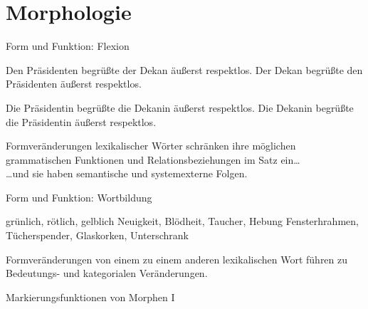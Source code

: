 \section{Morphologie}

\begin{frame}
  {Form und Funktion: Flexion}
  \pause
  \begin{exe}
    \ex
    \begin{xlist}
      \ex \alert{Den Präsidenten} begrüßte \alert{der Dekan} äußerst respektlos.
      \pause
      \ex \alert{Der Dekan} begrüßte \alert{den Präsidenten} äußerst respektlos.
    \end{xlist}
    \pause
    \ex
    \begin{xlist}
      \ex \alert{Die Präsidentin} begrüßte \alert{die Dekanin} äußerst respektlos.
      \pause
      \ex \alert{Die Dekanin} begrüßte \alert{die Präsidentin} äußerst respektlos.
    \end{xlist}
  \end{exe}
  \pause
  \Zeile
  Formveränderungen lexikalischer Wörter \alert{schränken ihre möglichen grammatischen Funktionen und Relationsbeziehungen im Satz ein}\dots\\
  \pause
  \Halbzeile
  \dots und sie haben semantische und systemexterne Folgen.

\end{frame}

\begin{frame}
  {Form und Funktion: Wortbildung}
  \pause
  \begin{exe}
    \ex grün\alert{lich}, röt\alert{lich}, gelb\alert{lich}
    \pause
    \ex Neu\alert{igkeit}, Blöd\alert{heit}, Tauch\alert{er}, Heb\alert{ung}
    \pause
    \ex Fensterh\alert{rahmen}, Tücher\alert{spender}, Glas\alert{korken}, Unter\alert{schrank}
  \end{exe}
  \pause
  \Zeile
  Formveränderungen von einem zu einem anderen lexikalischen Wort führen zu Bedeutungs- und kategorialen Veränderungen.
\end{frame}

\begin{frame}
  {Markierungsfunktionen von Morphen I}
  \pause
  \begin{exe}
    \ex
    \begin{xlist}
    \end{xlist}
    \pause
    \ex
    \begin{xlist}
    \end{xlist}
  \end{exe}
\end{frame}

